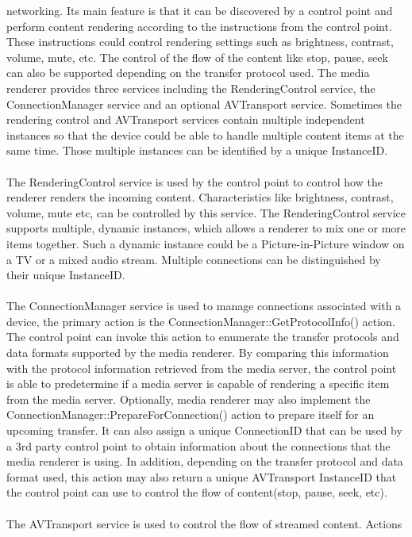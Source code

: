 networking. Its main feature is that it can be discovered by a control point and perform content rendering according to the instructions from the control point. These instructions could control rendering settings such as brightness, contrast, volume, mute, etc. The control of the flow of the content like stop, pause, seek can also be supported depending on the transfer protocol used. The media 
renderer provides three services including the RenderingControl service, the ConnectionManager 
service and an optional AVTransport service. Sometimes the rendering control and 
AVTransport services contain multiple independent instances so that the device 
could be able to handle multiple content items at the same time. Those multiple 
instances can be identified by a unique InstanceID. \\
\\
The RenderingControl service is used by the control point to control how the renderer 
renders the incoming content. Characteristics like brightness, contrast, 
volume, mute etc, can be controlled by this service. The RenderingControl service 
supports multiple, dynamic instances, which allows a renderer to mix one or 
more items together. Such a dynamic instance could be a Picture-in-Picture
window on a TV or a mixed audio stream. Multiple connections can be
distinguished by their unique InstanceID. \\
\\
The ConnectionManager service is used to manage connections associated with a 
device, the primary action is the ConnectionManager::GetProtocolInfo() action. 
The control point can invoke this action to enumerate the transfer protocols and 
data formats supported by the media renderer. By comparing this information with 
the protocol information retrieved from the media server, the control point is able to 
predetermine if a media server is capable of rendering a specific item from 
the media server. Optionally, media renderer may also implement the
ConnectionManager::PrepareForConnection() action to prepare itself for an 
upcoming transfer. It can also assign a unique ConnectionID that can be used by 
a 3rd party control point to obtain information about the connections that the media 
renderer is using. In addition, depending on the transfer protocol and data 
format used, this action may also return a unique AVTransport InstanceID that the control 
point can use to control the flow of content(stop, pause, seek, etc). \\
\\
The AVTransport service is used to control the flow of streamed content. Actions 
